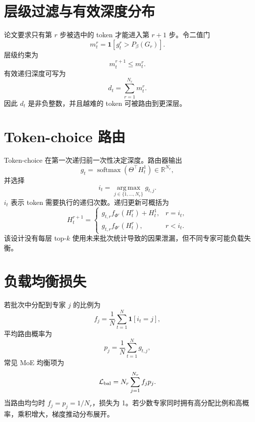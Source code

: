 \documentclass[UTF8,12pt,a4paper,fontset=none]{ctexart}
\numberwithin{equation}{section}
\newcommand{\R}{\mathbb{R}}
\newcommand{\Loss}{\mathcal{L}}
\newcommand{\softmax}{\operatorname{softmax}}
\newcommand{\argmax}{\operatorname*{arg\,max}}
\begin{document}
\section{层级过滤与有效深度分布}
论文要求只有第 $r$ 步被选中的 token 才能进入第 $r+1$ 步。令二值门
\begin{equation}
 m_t^r=\mathbf1[g_t^r>P_\beta(G_r)].
\end{equation}
层级约束为
\begin{equation}
 m_t^{r+1}\le m_t^r.
\end{equation}
有效递归深度可写为
\begin{equation}
 d_t=\sum_{r=1}^{N_r}m_t^r.
\end{equation}
因此 $d_t$ 是非负整数，并且越难的 token 可被路由到更深层。

\section{Token-choice 路由}
Token-choice 在第一次递归前一次性决定深度。路由器输出
\begin{equation}
 g_t=\softmax(\Theta^\top H_t^1)\in\R^{N_r},
\end{equation}
并选择
\begin{equation}
 i_t=\argmax_{j\in\{1,\ldots,N_r\}}g_{t,j}.
\end{equation}
$i_t$ 表示 token 需要执行的递归次数。递归更新可概括为
\begin{equation}
 H_t^{r+1}=\begin{cases}
 g_{t,r}f_{\Phi'}(H_t^r)+H_t^1,&r=i_t,\\
 g_{t,r}f_{\Phi'}(H_t^r),&r<i_t.
 \end{cases}
\end{equation}
该设计没有每层 top-$k$ 使用未来批次统计导致的因果泄漏，但不同专家可能负载失衡。

\section{负载均衡损失}
若批次中分配到专家 $j$ 的比例为
\begin{equation}
 f_j=\frac1N\sum_{t=1}^{N}\mathbf1[i_t=j],
\end{equation}
平均路由概率为
\begin{equation}
 p_j=\frac1N\sum_{t=1}^{N}g_{t,j},
\end{equation}
常见 MoE 均衡项为
\begin{equation}
 \Loss_{\rm bal}=N_r\sum_{j=1}^{N_r}f_jp_j.
\end{equation}
当路由均匀时 $f_j=p_j=1/N_r$，损失为 1。若少数专家同时拥有高分配比例和高概率，乘积增大，梯度推动分布展开。
\end{document}
